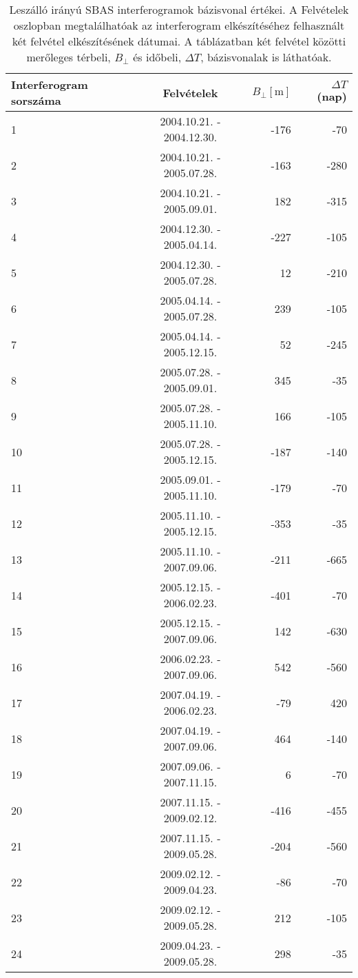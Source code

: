 \documentclass[12pt]{report}
\numberwithin{equation}{section}
\numberwithin{table}{section}
\numberwithin{figure}{section}
\begin{document}
\begin{table}[H]
    \begin{center}
        \begin{tabular}{p{2cm} c r r} \toprule
            Interferogram sorszáma & Felvételek & $B_{\perp} [\si{\meter}]$ & $\Delta T$ (nap) \\ \midrule
            1 &  2004.10.21. - 2004.12.30. & -176 &   -70 \\
            2 &  2004.10.21. - 2005.07.28. & -163 &  -280 \\
            3 &  2004.10.21. - 2005.09.01. &  182 &  -315 \\
            4 &  2004.12.30. - 2005.04.14. & -227 &  -105 \\
            5 &  2004.12.30. - 2005.07.28. &   12 &  -210 \\
            6 &  2005.04.14. - 2005.07.28. &  239 &  -105 \\
            7 &  2005.04.14. - 2005.12.15. &   52 &  -245 \\
            8 &  2005.07.28. - 2005.09.01. &  345 &   -35 \\
            9 &  2005.07.28. - 2005.11.10. &  166 &  -105 \\
            10 &  2005.07.28. - 2005.12.15. & -187 &  -140 \\
            11 &  2005.09.01. - 2005.11.10. & -179 &   -70 \\
            12 &  2005.11.10. - 2005.12.15. & -353 &   -35 \\
            13 &  2005.11.10. - 2007.09.06. & -211 &  -665 \\
            14 &  2005.12.15. - 2006.02.23. & -401 &   -70 \\
            15 &  2005.12.15. - 2007.09.06. &  142 &  -630 \\
            16 &  2006.02.23. - 2007.09.06. &  542 &  -560 \\
            17 &  2007.04.19. - 2006.02.23. &  -79 &   420 \\
            18 &  2007.04.19. - 2007.09.06. &  464 &  -140 \\
            19 &  2007.09.06. - 2007.11.15. &    6 &   -70 \\
            20 &  2007.11.15. - 2009.02.12. & -416 &  -455 \\
            21 &  2007.11.15. - 2009.05.28. & -204 &  -560 \\
            22 &  2009.02.12. - 2009.04.23. &  -86 &   -70 \\
            23 &  2009.02.12. - 2009.05.28. &  212 &  -105 \\
            24 &  2009.04.23. - 2009.05.28. &  298 &   -35 \\ \bottomrule
        \end{tabular}
        \caption{Leszálló irányú SBAS interferogramok bázisvonal értékei. A Felvételek oszlopban megtalálhatóak az interferogram elkészítéséhez felhasznált két felvétel elkészítésének dátumai. A táblázatban két felvétel közötti merőleges térbeli, $B_{\perp}$ és időbeli, $\Delta T$, bázisvonalak is láthatóak. }\label{sbas_dsc}
    \end{center}
\end{table}
\end{document}
